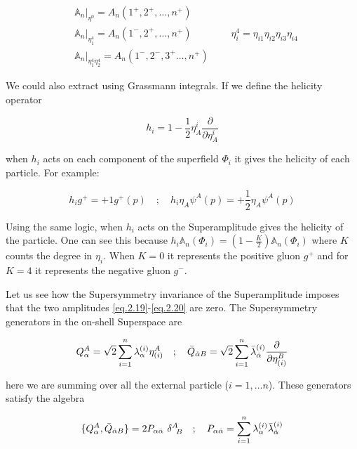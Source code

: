 \begin{align}
&\mathbb{A}_{n} \big|_{\eta^{0}}  = A_{n}(1^{+},2^{+},\dots,n^{+}) \label{eq.2.19}\\ 
&\mathbb{A}_{n} \big|_{\eta^{4}_{1}}  = A_{n}(1^{-},2^{+},\dots,n^{+}) \label{eq.2.20}  \quad \quad \quad \quad \eta^{4}_{i} =\eta_{i1}\eta_{i2}\eta_{i3}\eta_{i4} \\
&\mathbb{A}_{n} \big|_{\eta^{4}_{1}\eta^{4}_{2}}  = A_{n}(1^{-},2^{-},3^{+}\dots,n^{+}) 
\end{align}



We could also extract using Grassmann integrals. If we define the helicity operator 

\begin{equation}
h_{i} = 1-\frac{1}{2}\eta_{A}^{i}\frac{\partial}{\partial\eta_{A}^{i}} 
\end{equation}

when $h_{i}$ acts on each component of the superfield $\Phi_{i}$  it gives the helicity of each particle. For example:

\begin{equation}
h_{i}g^{+} =  +1 g^{+}(p)  \quad ; \quad h_{i}\eta_{A}\psi^{A}(p) = +\frac{1}{2}\eta_{A}\psi^{A}(p)
\end{equation}

Using the same logic, when $h_{i}$ acts on  the Superamplitude gives the helicity of the particle. One can see this because $h_{i}\mathbb{A}_{n}(\Phi_{i}) = (1 -\frac{K}{2})\mathbb{A}_{n}(\Phi_{i}) $ where $K$ counts the degree in $\eta_{i}$. When $K=0$ it represents the positive gluon $ g^{+}$ and for $K=4$ it represents the negative gluon $g^{-}$.


Let us see how the Supersymmetry invariance of the Superamplitude imposes that the  two amplitudes \eqref{eq.2.19}-\eqref{eq.2.20} are zero. The Supersymmetry generators in the on-shell Superspace are

\begin{equation}
Q^{A}_{\alpha} = \sqrt{2}\sum_{i=1}^{n}\lambda_{\alpha}^{(i)}\eta^{A}_{(i)} \quad ; \quad \bar{Q}_{\dot{\alpha} B} = \sqrt{2}\sum_{i=1}^{n}\bar{\lambda}_{\dot{\alpha}}^{(i)}\frac{\partial}{\partial\eta^{B}_{(i)}}
\end{equation}

here we are summing over all the external particle ($i=1 ,\dots n$). These generators satisfy  the algebra  


\begin{equation}
\{Q_{\alpha}^{A},\bar{Q}_{\dot{\alpha} B}\} = 2P_{\alpha \dot{\alpha}} \ \delta^{A}_{\;\;B} \quad; \quad P_{\alpha \dot{\alpha}} = \sum_{i=1}^{n} \lambda_{\alpha}^{(i)}\bar{\lambda}_{\dot{\alpha}}^{(i)}
\end{equation}

